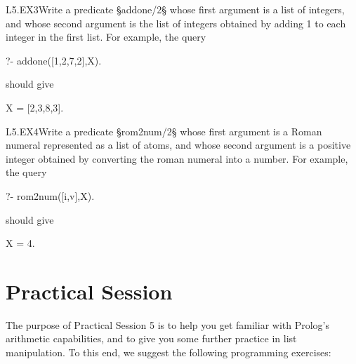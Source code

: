 \clearpage
\begin{LPNexercise}{L5.EX3}Write a predicate
§addone/2§ whose first argument is a list of integers, and whose
second argument is the list of integers obtained by adding 1 to each
integer in the first list.  For example, the query
\begin{LPNcodedisplay}
?- addone([1,2,7,2],X).
\end{LPNcodedisplay}
should give
\begin{LPNcodedisplay}
X = [2,3,8,3].
\end{LPNcodedisplay}
\end{LPNexercise}

\begin{LPNexercise}{L5.EX4}Write a predicate
§rom2num/2§ whose first argument is a Roman numeral represented as a list of atoms, and whose
second argument is a positive integer obtained by converting the roman numeral into a number.
For example, the query
\begin{LPNcodedisplay}
?- rom2num([i,v],X).
\end{LPNcodedisplay}
should give
\begin{LPNcodedisplay}
X = 4.
\end{LPNcodedisplay}
\end{LPNexercise}


\section{Practical Session}\label{SEC.L5.PRAXIS}



The purpose of Practical Session 5 is to help you get familiar with
Prolog's arithmetic capabilities, and to give you some further
practice in list manipulation. To this end, we suggest the following
programming exercises:

